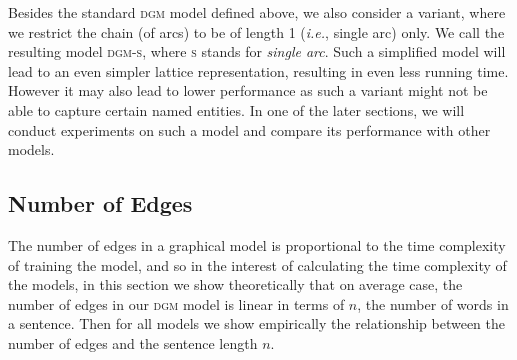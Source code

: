 Besides the standard \textsc{dgm} model defined above, we also consider a variant, where we restrict the  chain (of arcs) to be of length 1 ({\em i.e.}, single arc) only. We call the resulting model \textsc{dgm-s}, where \textsc{s} stands for {\em single arc}.
Such a simplified model will lead to an even simpler lattice representation, resulting in even less running time.
However it may also lead to  lower performance as such a  variant might not be able to capture certain named entities.
In one of the later sections, we will conduct experiments on such a model and compare its performance with other models.

\subsection{Number of Edges}
\label{sec:numedges}
The number of edges in a graphical model is proportional to the time complexity of training the model, and so in the interest of calculating the time complexity of the models, in this section we show theoretically that on average case, the number of edges in our \textsc{dgm} model is linear in terms of $n$, the number of words in a sentence. Then for all models we show empirically the relationship between the number of edges and the sentence length $n$.


